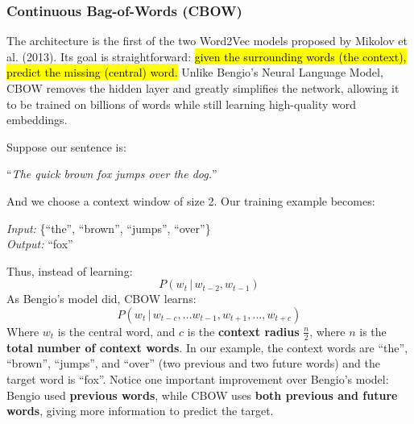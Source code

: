 \subsubsection{Continuous Bag-of-Words (CBOW)}\label{sec:continuous-bag-of-words-cbow}

The  architecture is the first of the two Word2Vec models proposed by Mikolov et al. (2013).\cite{mikolov2013efficient} Its goal is straightforward: \hl{given the surrounding words (the context), predict the missing (central) word.} Unlike Bengio's Neural Language Model, CBOW removes the hidden layer and greatly simplifies the network, allowing it to be trained on billions of words while still learning high-quality word embeddings.

\highspace
Suppose our sentence is:
\begin{center}
    ``\emph{The quick brown fox jumps over the dog.}''
\end{center}

\noindent
And we choose a context window of size 2. Our training example becomes:
\begin{center}
    \emph{Input:} \{``the'', ``brown'', ``jumps'', ``over''\} \\
    \emph{Output:} ``fox''
\end{center}

\noindent
Thus, instead of learning:
\begin{equation*}
    P\left(w_t \, | \, w_{t-2}, w_{t-1}\right)
\end{equation*}
As Bengio's model did, CBOW learns:
\begin{equation*}
    P\left(w_t \, | \, w_{t-c}, \dots w_{t-1}, w_{t+1}, \dots, w_{t+c}\right)
\end{equation*}
Where $w_t$ is the central word, and $c$ is the \textbf{context radius} $\frac{n}{2}$, where $n$ is the \textbf{total number of context words}. In our example, the context words are ``the'', ``brown'', ``jumps'', and ``over'' (two previous and two future words) and the target word is ``fox''. Notice one important improvement over Bengio's model: Bengio used \textbf{previous words}, while CBOW uses \textbf{both previous and future words}, giving more information to predict the target.

